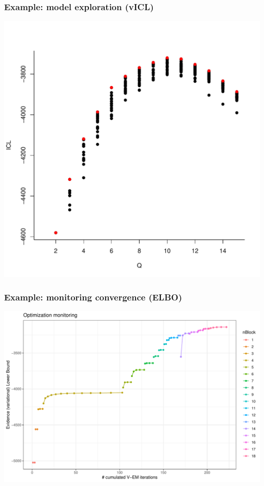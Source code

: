\documentclass{beamer}\usepackage[]{graphicx}\usepackage[]{color}
\newenvironment{knitrout}{}{} %
\begin{document}
\begin{frame}[fragile]
    \frametitle{Example: model exploration (vICL)}

\includegraphics[width=.7\textwidth]{figures/ICL_fblog}

\end{frame}

\begin{frame}[fragile]
    \frametitle{Example: monitoring convergence (ELBO)}



\begin{knitrout}\scriptsize
{}\color{fgcolor}
\includegraphics[width=.8\textwidth]{figures/unnamed-chunk-14-1} 
\end{knitrout}

\end{frame}
\end{document}
